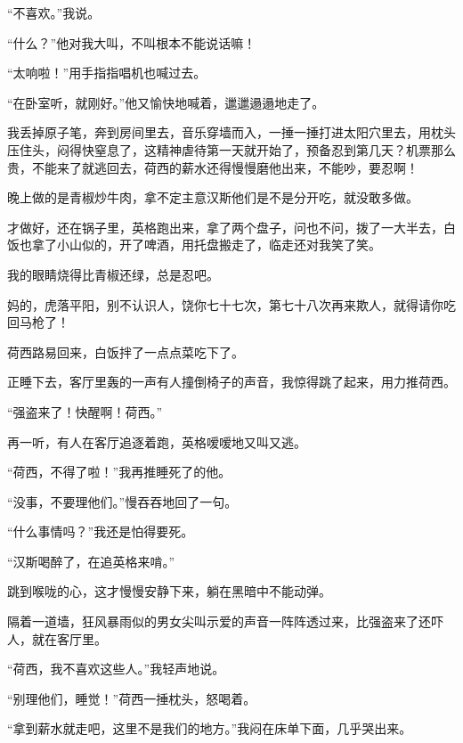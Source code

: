 \par “不喜欢。”我说。
\par “什么？”他对我大叫，不叫根本不能说话嘛！
\par “太响啦！”用手指指唱机也喊过去。
\par “在卧室听，就刚好。”他又愉快地喊着，邋邋遢遢地走了。
\par 我丢掉原子笔，奔到房间里去，音乐穿墙而入，一捶一捶打进太阳穴里去，用枕头压住头，闷得快窒息了，这精神虐待第一天就开始了，预备忍到第几天？机票那么贵，不能来了就逃回去，荷西的薪水还得慢慢磨他出来，不能吵，要忍啊！
\par 晚上做的是青椒炒牛肉，拿不定主意汉斯他们是不是分开吃，就没敢多做。
\par 才做好，还在锅子里，英格跑出来，拿了两个盘子，问也不问，拨了一大半去，白饭也拿了小山似的，开了啤酒，用托盘搬走了，临走还对我笑了笑。
\par 我的眼睛烧得比青椒还绿，总是忍吧。
\par 妈的，虎落平阳，别不认识人，饶你七十七次，第七十八次再来欺人，就得请你吃回马枪了！
\par 荷西路易回来，白饭拌了一点点菜吃下了。
\par 正睡下去，客厅里轰的一声有人撞倒椅子的声音，我惊得跳了起来，用力推荷西。
\par “强盗来了！快醒啊！荷西。”
\par 再一听，有人在客厅追逐着跑，英格嗳嗳地又叫又逃。
\par “荷西，不得了啦！”我再推睡死了的他。
\par “没事，不要理他们。”慢吞吞地回了一句。
\par “什么事情吗？”我还是怕得要死。
\par “汉斯喝醉了，在追英格来啃。”
\par 跳到喉咙的心，这才慢慢安静下来，躺在黑暗中不能动弹。
\par 隔着一道墙，狂风暴雨似的男女尖叫示爱的声音一阵阵透过来，比强盗来了还吓人，就在客厅里。
\par “荷西，我不喜欢这些人。”我轻声地说。
\par “别理他们，睡觉！”荷西一捶枕头，怒喝着。
\par “拿到薪水就走吧，这里不是我们的地方。”我闷在床单下面，几乎哭出来。


